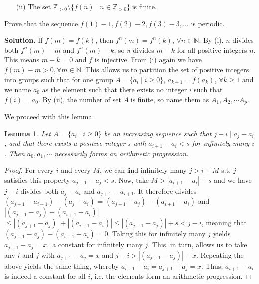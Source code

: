 \documentclass[11pt,a4paper]{article}
\newtheorem{lemma}{Lemma}
\begin{document}
\begin{enumerate}
\begin{enumerate}
	\item [(ii)] The set $\mathbb{Z}_{>0} \setminus \{f(n) \mid n\in \mathbb{Z}_{>0}\}$ is finite.
\end{enumerate}

Prove that the sequence $f(1) - 1, f(2) - 2, f(3) - 3, \ldots$ is periodic.

\textbf{Solution.} If $f(m)=f(k)$, then $f^n(m)=f^n(k)$, $\forall n\in\mathbb{N}$. By (i), $n$ divides both $f^n(m)-m$ and $f^n(m)-k$, so $n$ divides $m-k$ for all positive integers $n$. This means $m-k=0$ and $f$ is injective. From (i) again we have $f(m)-m>0,\forall m\in\mathbb{N}$. This allows us to partition the set of positive integers into groups such that for one group $A=\{a_i\mid i\ge 0\}$, $a_{k+1}=f(a_k)$, $\forall k\ge 1$ and we name $a_0$ as the element such that there exists no integer $i$ such that $f(i)=a_0$. By (ii), the number of set $A$ is finite, so name them as $A_1, A_2, \cdots A_p$. 

We proceed with this lemma. 
\begin{lemma}
	Let $A=\{a_i\mid i\ge 0\}$ be an increasing sequence such that $j - i\mid a_j - a_i$, and that there exists a positive integer $s$ with $a_{i+1}-a_i<s$ for infinitely many $i$. 
	Then $a_0, a_1,\cdots $ necessarily forms an arithmetic progression.
\end{lemma}
\begin{proof}
	For every $i$ and every $M$, we can find infinitely many $j>i+M$ s.t. $j$ satisfies this property  $a_{j+1}-a_j<s$. Now, take $M>|a_{i+1}-a_{i}|+s$ and we have $j-i$ divides both $a_j-a_i$ and $a_{j+1}-a_{i+1}$. It therefore divides $(a_{j+1}-a_{i+1})-(a_j-a_i)$ = $(a_{j+1}-a_{j})-(a_{i+1}-a_i)$ and $|(a_{j+1}-a_{j})-(a_{i+1}-a_i)|$ $\le |(a_{j+1}-a_{j})|+|(a_{i+1}-a_i)|\le |(a_{j+1}-a_{j})|+s<j-i$, meaning that $(a_{j+1}-a_{j})-(a_{i+1}-a_i)=0$. Taking this for infinitely many $j$ yields $a_{j+1}-a_{j}=x,$ a constant for infinitely many $j$. This, in turn, allows us to take any $i$ and $j$ with $a_{j+1}-a_{j}=x$ and $j-i>|(a_{j+1}-a_{j})|+x$. Repeating the above yields the same thing, whereby $a_{i+1}-a_{i}=a_{j+1}-a_j=x$. Thus, $a_{i+1}-a_i$ is indeed a constant for all $i$, i.e. the elements form an arithmetic progression. 
\end{proof}



\end{enumerate}
\end{document}

